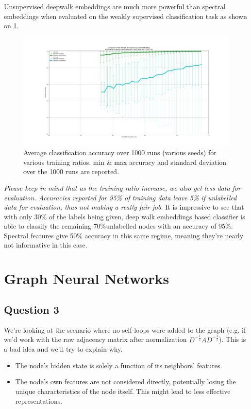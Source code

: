\documentclass[a4paper]{article}
\begin{document}
Unsupervised deepwalk embeddings are much more powerful than spectral embeddings when evaluated on
the weakly supervised classification task as shown on \ref{fig:deepwalk_vs_laplacian_embdeddings}.
\begin{figure}[ht]
    \centering
    \includegraphics[width=1.\textwidth]{figures/deepwalk_vs_laplacian_embeddings_1000runs.png}
    \caption{Average classification accuracy over 1000 runs (various seeds) for various training ratios. 
    min \& max accuracy and standard deviation over the 1000 runs are reported.}
    \label{fig:deepwalk_vs_laplacian_embdeddings}
\end{figure}
\textit{Please keep in mind that as the training ratio increase, we also get less data for evaluation.
Accuracies reported for 95\% of training data leave 5\% if unlabelled data for evaluation,
thus not making a really fair job.} It is impressive to see that with only 30\% of the labels being given, deep walk
embeddings based classifier is able to classify the remaining 70\%unlabelled nodes with an accuracy of 95\%.
Spectral features give 50\% accuracy in this same regime, meaning they're nearly not informative in this case.



\break

\section{Graph Neural Networks}
\subsection*{Question 3}


We're looking at the scenario where no self-loops were added to the graph (e.g. if we'd work with the raw adjacency matrix after normalization
$D^{-\frac{1}{2}} A D^{-\frac{1}{2}}$). This is a bad idea and we'll try to explain why.
\begin{itemize}
    \item The node's hidden state is solely a function of its neighbors' features.
    \item The node's own features are not considered directly, potentially losing the unique characteristics of the node itself. This might lead to less effective representations.
\end{itemize}
\end{document}
